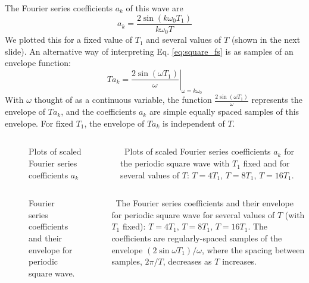 \begin{frame}
    The Fourier series coefficients $a_k$ of this wave are
    \begin{equation}\label{eq:square_fs}
        a_k = \frac{2\sin(k\omega_0T_1)}{k\omega_0T}
    \end{equation}
    We plotted this for a fixed value of $T_1$ and several values of $T$ (shown in the next slide). An alternative way of interpreting Eq. \ref{eq:square_fs} is as samples of an envelope function:
    \begin{equation*}
        Ta_k = \left.\frac{2\sin(\omega T_1)}{\omega}\right|_{\omega=k\omega_0}
    \end{equation*}
    \pause
    With $\omega$ thought of as a continuous variable, the function $\frac{2\sin(\omega T_1)}{\omega}$ represents the envelope of $Ta_k$, and the coefficients $a_k$ are simple equally spaced samples of this envelope.
    For fixed $T_1$, the envelope of $Ta_k$ is independent of $T$.
    \pause


\end{frame}

\begin{frame}[plain,t]
    \begin{columns}
        {
        \begin{figure}
          \centering
          
          \caption{Plots of scaled Fourier series coefficients $a_k$}\label{fi:example02_periodic_square_fs}
        \end{figure}
        }
        {
            \small
            \noindent~Plots of scaled Fourier series coefficients $a_k$ for the periodic square wave with $T_1$ fixed and for several values of $T$: $T=4T_1$, $T=8T_1$, $T=16T_1$.

        }
    \end{columns}
\end{frame}


\begin{frame}[plain,t]
    \begin{columns}
        {
        \begin{figure}
          \centering
          
          \caption{Fourier series coefficients and their envelope for periodic square wave.}\label{fi:periodic_square_fs_samples_of_envilope}
        \end{figure}
        }
        {
            \small
            \noindent~The Fourier series coefficients and their envelope for periodic square wave for several values of $T$ (with $T_1$ fixed): $T=4T_1$, $T=8T_1$, $T=16T_1$. The coefficients are regularly-spaced samples of the envelope $(2\sin \omega T_1)/\omega$, where the spacing between samples, $2\pi/T$, decreases as $T$ increases.
        }
    \end{columns}
\end{frame}


